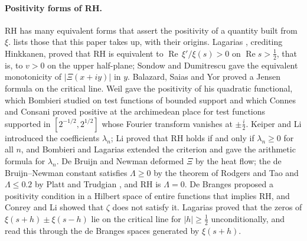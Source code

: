 \documentclass[11pt]{article}
\theoremstyle{definition}\newtheorem{definition}[theorem]{Definition}
\theoremstyle{remark}\newtheorem{remark}[theorem]{Remark}
\renewcommand{\Re}{\operatorname{Re}}\renewcommand{\Im}{\operatorname{Im}}
\begin{document}
\paragraph{Positivity forms of RH.} RH has many equivalent forms that assert the positivity of a quantity built from $\xi$.  lists those that this paper takes up, with their origins. Lagarias \cite{Lagarias99}, crediting Hinkkanen, proved that RH is equivalent to $\Re\,\xi'/\xi(s)>0$ on $\Re s>\frac12$, that is, to $v>0$ on the upper half-plane; Sondow and Dumitrescu \cite{SD} gave the equivalent monotonicity of $|\Xi(x+iy)|$ in $y$. Balazard, Saias and Yor \cite{BSY} proved a Jensen formula on the critical line. Weil \cite{Weil} gave the positivity of his quadratic functional, which Bombieri \cite{Bombieri} studied on test functions of bounded support and which Connes and Consani \cite{CC} proved positive at the archimedean place for test functions supported in $[2^{-1/2},2^{1/2}]$ whose Fourier transform vanishes at $\pm\frac i2$. Keiper \cite{Keiper} and Li \cite{Li} introduced the coefficients $\lambda_n$; Li \cite{Li} proved that RH holds if and only if $\lambda_n\ge0$ for all $n$, and Bombieri and Lagarias \cite{BL} extended the criterion and gave the arithmetic formula for $\lambda_n$. De Bruijn \cite{deBruijn} and Newman \cite{Newman76} deformed $\Xi$ by the heat flow; the de Bruijn--Newman constant satisfies $\Lambda\ge0$ by the theorem of Rodgers and Tao \cite{RT} and $\Lambda\le0.2$ by Platt and Trudgian \cite[Cor.~2]{PT}, and RH is $\Lambda=0$. De Branges \cite{deBranges86} proposed a positivity condition in a Hilbert space of entire functions that implies RH, and Conrey and Li \cite{CL} showed that $\zeta$ does not satisfy it. Lagarias \cite{Lagarias05} proved that the zeros of $\xi(s+h)\pm\xi(s-h)$ lie on the critical line for $|h|\ge\frac12$ unconditionally, and read this through the de Branges spaces generated by $\xi(s+h)$.
\end{document}
